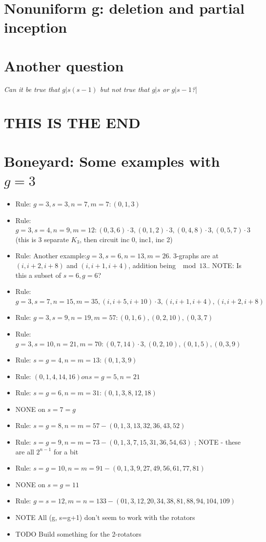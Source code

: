 \documentclass[11pt, oneside]{article} 	%
\begin{document}
\section{Nonuniform g: deletion and partial inception}



\section{Another question}

\emph{Can it be true that  $g | s(s-1)$  but not true that $g | s$ or $g | s-1$?}|


\section{THIS IS THE END}



\section{Boneyard: Some examples with $g=3$}


\begin{itemize}

\item Rule: $g=3, s=3, n=7, m=7: (0,1,3)$
\item Rule: $g=3, s=4, n = 9, m = 12: (0,3,6) \cdot 3, (0,1,2) \cdot 3, (0,4,8) \cdot 3, (0, 5,7) \cdot 3$ (this is 3 separate $K_3$, then circuit inc 0, inc1, inc 2)
\item Rule: Another example:$ g=3, s=6, n=13, m=26$.  3-graphs are at $(i, i+2, i+8)$ and $(i, i+1, i+4)$, addition being $\mod 13$..  NOTE: Is this a subset of $s=6, g=6$?
\item Rule: $g=3, s=7, n=15, m=35, (i, i+5, i+10) \cdot 3, (i, i+1, i+4), (i, i+2, i+8)$
\item Rule: $g=3, s=9, n=19, m=57: (0,1,6), (0,2,10), (0,3,7)$
\item Rule: $g=3, s=10, n=21, m=70: (0,7,14) \cdot 3, (0,2,10), (0,1,5), (0,3,9)$
\item Rule: $s=g=4, n=m=13: (0, 1, 3, 9)$
\item Rule: $(0,1,4,14,16) on s=g=5, n=21$
\item Rule: $s=g=6, n=m=31: (0, 1, 3, 8, 12, 18)$
\item NONE on $s=7=g$
\item Rule: $s=g=8, n=m=57 - (0,1, 3, 13, 32, 36, 43, 52)$
\item Rule: $s=g=9, n=m=73 - (0,1, 3, 7, 15, 31, 36, 54, 63)$  ; NOTE - these are all $2^{n-1}$ for a bit	
\item Rule: $s=g=10, n=m=91 - (0, 1, 3, 9, 27, 49, 56, 61, 77, 81)$
\item NONE on $s=g=11$
\item Rule: $g=s=12, m=n=133 - (0 1, 3, 12, 20, 34, 38, 81, 88, 94, 104, 109)$
\item NOTE All (g, s=g+1) don't seem to work with the rotators
\item TODO Build something for the 2-rotators
\end{itemize}
\end{document}
